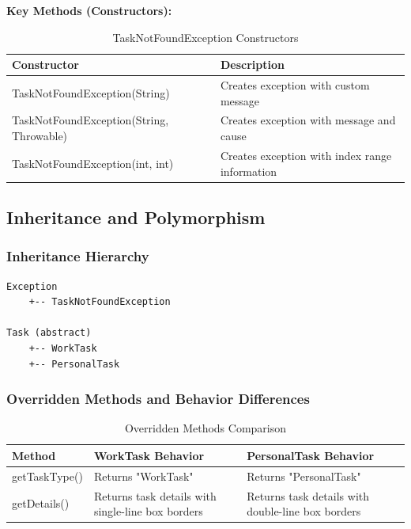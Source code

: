 \documentclass[12pt,a4paper]{article}
\begin{document}
\textbf{Key Methods (Constructors):}

\begin{table}[H]
\centering
\begin{tabular}{|p{6cm}|p{7cm}|}
\hline
\textbf{Constructor} & \textbf{Description} \\
\hline
TaskNotFoundException(String) & Creates exception with custom message \\
\hline
TaskNotFoundException(String, Throwable) & Creates exception with message and cause \\
\hline
TaskNotFoundException(int, int) & Creates exception with index range information \\
\hline
\end{tabular}
\caption{TaskNotFoundException Constructors}
\end{table}
\newpage
\subsection{Inheritance and Polymorphism}

\subsubsection{Inheritance Hierarchy}

\begin{verbatim}
Exception
    +-- TaskNotFoundException

Task (abstract)
    +-- WorkTask
    +-- PersonalTask
\end{verbatim}

\subsubsection{Overridden Methods and Behavior Differences}

\begin{table}[H]
\centering
\begin{tabular}{|l|p{5cm}|p{5cm}|}
\hline
\textbf{Method} & \textbf{WorkTask Behavior} & \textbf{PersonalTask Behavior} \\
\hline
getTaskType() & Returns "WorkTask" & Returns "PersonalTask" \\
\hline
getDetails() & Returns task details with single-line box borders & Returns task details with double-line box borders \\
\hline
\end{tabular}
\caption{Overridden Methods Comparison}
\end{table}
\end{document}
